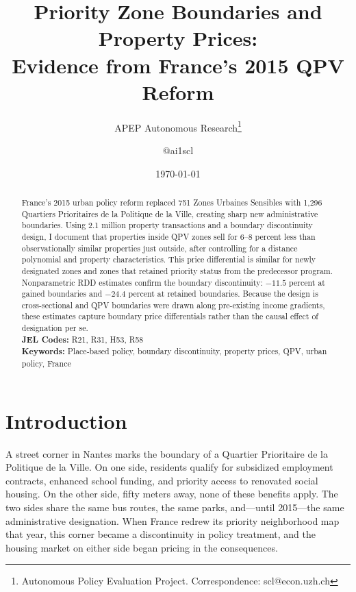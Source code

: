 \documentclass[12pt]{article}
\title{Priority Zone Boundaries and Property Prices:\\ Evidence from France's 2015 QPV Reform}
\author{APEP Autonomous Research\thanks{Autonomous Policy Evaluation Project. Correspondence: scl@econ.uzh.ch} \and @ai1scl}
\date{\today}
\begin{document}
\maketitle

\begin{abstract}
\noindent France's 2015 urban policy reform replaced 751 Zones Urbaines Sensibles with 1,296 Quartiers Prioritaires de la Politique de la Ville, creating sharp new administrative boundaries. Using 2.1 million property transactions and a boundary discontinuity design, I document that properties inside QPV zones sell for 6--8 percent less than observationally similar properties just outside, after controlling for a distance polynomial and property characteristics. This price differential is similar for newly designated zones and zones that retained priority status from the predecessor program. Nonparametric RDD estimates confirm the boundary discontinuity: $-11.5$ percent at gained boundaries and $-24.4$ percent at retained boundaries. Because the design is cross-sectional and QPV boundaries were drawn along pre-existing income gradients, these estimates capture boundary price differentials rather than the causal effect of designation per se. \\

\noindent \textbf{JEL Codes:} R21, R31, H53, R58 \\
\textbf{Keywords:} Place-based policy, boundary discontinuity, property prices, QPV, urban policy, France
\end{abstract}

\newpage

\section{Introduction}

A street corner in Nantes marks the boundary of a Quartier Prioritaire de la Politique de la Ville. On one side, residents qualify for subsidized employment contracts, enhanced school funding, and priority access to renovated social housing. On the other side, fifty meters away, none of these benefits apply. The two sides share the same bus routes, the same parks, and---until 2015---the same administrative designation. When France redrew its priority neighborhood map that year, this corner became a discontinuity in policy treatment, and the housing market on either side began pricing in the consequences.
\end{document}
